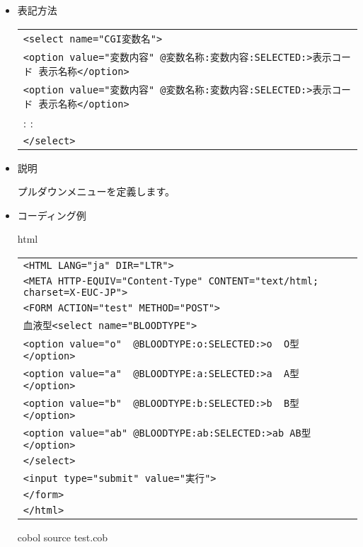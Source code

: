 \begin{itemize}

\item{表記方法}

\begin{tabular}{l}
\verb+<select name="CGI変数名">+\\
\verb+<option value="変数内容" @変数名称:変数内容:SELECTED:>表示コード 表示名称</option>+\\
\verb+<option value="変数内容" @変数名称:変数内容:SELECTED:>表示コード 表示名称</option>+\\
   : : \\
\verb+</select>+\\
\end{tabular}

\item{説明}

プルダウンメニューを定義します。

\item{コーディング例}

{\gt html}

\begin{tabular}{|l|}
\hline
\verb+<HTML LANG="ja" DIR="LTR">+\\
\verb+<META HTTP-EQUIV="Content-Type" CONTENT="text/html; charset=X-EUC-JP">+\\
\verb+<FORM ACTION="test" METHOD="POST">+\\
\verb+血液型<select name="BLOODTYPE">+\\
\verb+<option value="o"  @BLOODTYPE:o:SELECTED:>o  O型 </option>+\\
\verb+<option value="a"  @BLOODTYPE:a:SELECTED:>a  A型 </option>+\\
\verb+<option value="b"  @BLOODTYPE:b:SELECTED:>b  B型 </option>+\\
\verb+<option value="ab" @BLOODTYPE:ab:SELECTED:>ab AB型</option>+\\
\verb+</select>+\\
\verb+<input type="submit" value="実行">+\\
\verb+</form>+\\
\verb+</html>+\\
\hline
\end{tabular}

{\gt cobol} source test.cob


\end{itemize}
